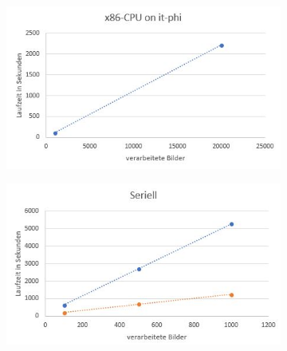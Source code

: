 \documentclass[../main.tex]{subfiles}
\begin{document}
\begin{figure}
	\begin{subfigure}{0.49\textwidth}
		\centering
		\includegraphics[width=\linewidth]{../images/Schmidt/bm_x86_phi.jpg}
	\end{subfigure}%
	\begin{subfigure}{0.49\textwidth}
		\centering
		\includegraphics[width=\linewidth]{../images/Schmidt/bm_serial_std.jpg}
	\end{subfigure}


\end{figure}
\end{document}
